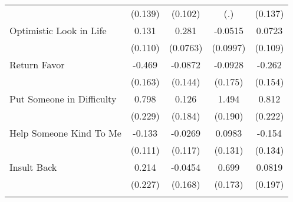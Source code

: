 {\begin{tabular}{l*{4}{c}}
            &     (0.139)         &     (0.102)         &         (.)         &     (0.137)         \\
[1em]
Optimistic Look in Life&       0.131         &       0.281\sym{***}&     -0.0515         &      0.0723         \\
            &     (0.110)         &    (0.0763)         &    (0.0997)         &     (0.109)         \\
[1em]
Return Favor&      -0.469\sym{**} &     -0.0872         &     -0.0928         &      -0.262         \\
            &     (0.163)         &     (0.144)         &     (0.175)         &     (0.154)         \\
[1em]
Put Someone in Difficulty&       0.798\sym{***}&       0.126         &       1.494\sym{***}&       0.812\sym{***}\\
            &     (0.229)         &     (0.184)         &     (0.190)         &     (0.222)         \\
[1em]
Help Someone Kind To Me&      -0.133         &     -0.0269         &      0.0983         &      -0.154         \\
            &     (0.111)         &     (0.117)         &     (0.131)         &     (0.134)         \\
[1em]
Insult Back &       0.214         &     -0.0454         &       0.699\sym{***}&      0.0819         \\
            &     (0.227)         &     (0.168)         &     (0.173)         &     (0.197)         \\
\hline\hline
{}\\
\end{tabular}
}
